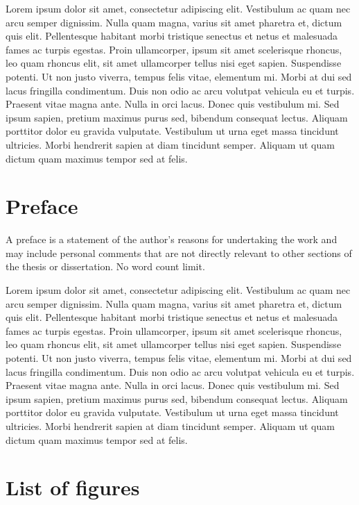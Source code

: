 \documentclass[12pt,a4paper]{report}
\newcommand{\daechapter}[1]{
  \chapter*{#1} %
  \addcontentsline{toc}{chapter}{#1} %
}
\begin{document}
\begin{gbox}
Lorem ipsum dolor sit amet, consectetur adipiscing elit. Vestibulum ac quam nec arcu semper dignissim. Nulla quam magna, varius sit amet pharetra et, dictum quis elit. Pellentesque habitant morbi tristique senectus et netus et malesuada fames ac turpis egestas. Proin ullamcorper, ipsum sit amet scelerisque rhoncus, leo quam rhoncus elit, sit amet ullamcorper tellus nisi eget sapien. Suspendisse potenti. Ut non justo viverra, tempus felis vitae, elementum mi. Morbi at dui sed lacus fringilla condimentum. Duis non odio ac arcu volutpat vehicula eu et turpis. Praesent vitae magna ante. Nulla in orci lacus. Donec quis vestibulum mi. Sed ipsum sapien, pretium maximus purus sed, bibendum consequat lectus. Aliquam porttitor dolor eu gravida vulputate. Vestibulum ut urna eget massa tincidunt ultricies. Morbi hendrerit sapien at diam tincidunt semper. Aliquam ut quam dictum quam maximus tempor sed at felis.
\end{gbox}

\daechapter{Preface}

\begin{ybox}
A preface is a statement of the author's reasons for undertaking the work and may include personal comments that are not directly relevant to other sections of the thesis or dissertation. No word count limit.
\end{ybox}

\begin{gbox}
Lorem ipsum dolor sit amet, consectetur adipiscing elit. Vestibulum ac quam nec arcu semper dignissim. Nulla quam magna, varius sit amet pharetra et, dictum quis elit. Pellentesque habitant morbi tristique senectus et netus et malesuada fames ac turpis egestas. Proin ullamcorper, ipsum sit amet scelerisque rhoncus, leo quam rhoncus elit, sit amet ullamcorper tellus nisi eget sapien. Suspendisse potenti. Ut non justo viverra, tempus felis vitae, elementum mi. Morbi at dui sed lacus fringilla condimentum. Duis non odio ac arcu volutpat vehicula eu et turpis. Praesent vitae magna ante. Nulla in orci lacus. Donec quis vestibulum mi. Sed ipsum sapien, pretium maximus purus sed, bibendum consequat lectus. Aliquam porttitor dolor eu gravida vulputate. Vestibulum ut urna eget massa tincidunt ultricies. Morbi hendrerit sapien at diam tincidunt semper. Aliquam ut quam dictum quam maximus tempor sed at felis.
\end{gbox}

\daechapter{List of figures}
\end{document}

